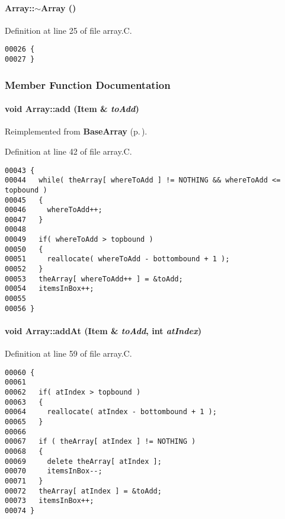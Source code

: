\paragraph{\setlength{\rightskip}{0pt plus 5cm}Array::$\sim$Array ()\hspace{0.3cm}{\tt  [virtual]}}\hfill



Definition at line 25 of file array.C.\small\begin{verbatim}00026 {
00027 }
\end{verbatim}\normalsize 


\subsubsection{Member Function Documentation}
\label{Array_a3}
\paragraph{\setlength{\rightskip}{0pt plus 5cm}void Array::add ({\bf Item} \& {\em to\-Add})\hspace{0.3cm}{\tt  [virtual]}}\hfill



Reimplemented from {\bf Base\-Array} {\rm (p.\,\pageref{BaseArray_a6})}.

Definition at line 42 of file array.C.\small\begin{verbatim}00043 {
00044   while( theArray[ whereToAdd ] != NOTHING && whereToAdd <= topbound )
00045   {
00046     whereToAdd++;
00047   } 
00048   
00049   if( whereToAdd > topbound )
00050   {
00051     reallocate( whereToAdd - bottombound + 1 );
00052   }
00053   theArray[ whereToAdd++ ] = &toAdd;
00054   itemsInBox++;
00055   
00056 }
\end{verbatim}\normalsize 
\label{Array_a4}
\paragraph{\setlength{\rightskip}{0pt plus 5cm}void Array::add\-At ({\bf Item} \& {\em to\-Add}, int {\em at\-Index})}\hfill



Definition at line 59 of file array.C.\small\begin{verbatim}00060 {
00061   
00062   if( atIndex > topbound )
00063   {
00064     reallocate( atIndex - bottombound + 1 );
00065   }
00066   
00067   if ( theArray[ atIndex ] != NOTHING )
00068   {
00069     delete theArray[ atIndex ];
00070     itemsInBox--;
00071   }
00072   theArray[ atIndex ] = &toAdd;
00073   itemsInBox++;
00074 }
\end{verbatim}\normalsize 
\label{Array_a6}
